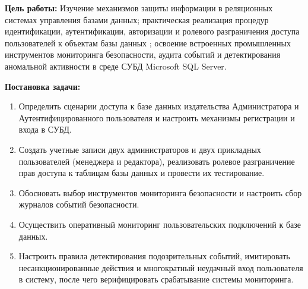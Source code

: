 \newpage
\setcounter{page}{2}
\renewcommand{\contentsname}{СОДЕРЖАНИЕ}
\tableofcontents

\newpage
{}

\textbf{Цель работы:}
Изучение механизмов защиты информации в реляционных системах управления базами данных; практическая реализация процедур идентификации, аутентификации, авторизации и ролевого разграничения доступа пользователей к объектам базы данных ; освоение встроенных промышленных инструментов мониторинга безопасности, аудита событий и детектирования аномальной активности в среде СУБД Microsoft SQL Server.

\textbf{Постановка задачи:}

\begin{enumerate}
    \item Определить сценарии доступа к базе данных издательства Администратора и Аутентифицированного пользователя и настроить механизмы регистрации и входа в СУБД.
    \item Создать учетные записи двух администраторов и двух прикладных пользователей (менеджера и редактора), реализовать ролевое разграничение прав доступа к таблицам базы данных и провести их тестирование.
    \item Обосновать выбор инструментов мониторинга безопасности и настроить сбор журналов событий безопасности.
    \item Осуществить оперативный мониторинг пользовательских подключений к базе данных.
    \item Настроить правила детектирования подозрительных событий, имитировать несанкционированные действия и многократный неудачный вход пользователя в систему, после чего верифицировать срабатывание системы мониторинга.
\end{enumerate}